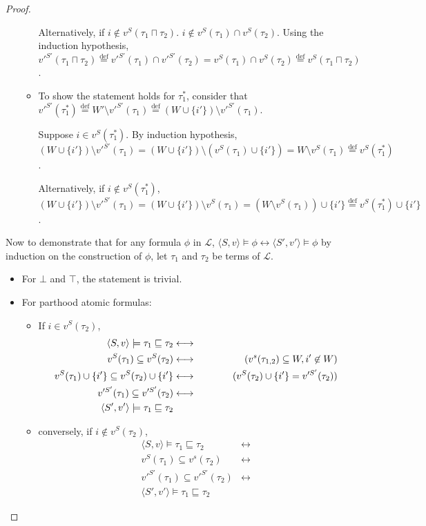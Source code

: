 \documentclass{article}
\newcommand{\lang}{\mathcal{L}}
\newcommand{\lcap}{\sqcap}
\newcommand{\lstar}{^*}
\newcommand{\lpart}{\sqsubseteq}
\newcommand{\eqdef}{\stackrel{\text{def}}{=}}
\begin{document}
\begin{proof}
\begin{itemize}
\begin{itemize}
      Alternatively, if $i \not \in v^S(\tau_1 \lcap \tau_2)$. $i \not \in v^S(\tau_1) \cap v^S(\tau_2)$. Using the induction hypothesis, $v'^{S'}(\tau_1 \lcap \tau_2) \eqdef v'^{S'}(\tau_1) \cap v'^{S'}(\tau_2) = v^S(\tau_1) \cap v^S(\tau_2) \eqdef v^S(\tau_1 \lcap \tau_2)$.

    \item To show the statement holds for $\tau_1\lstar$, consider that $v'^{S'}(\tau_1\lstar) \eqdef W' \setminus v'^{S'}(\tau_1) \eqdef (W \cup \{i'\}) \setminus v'^{S'}(\tau_1)$.

      Suppose $i \in v^S(\tau_1\lstar)$. By induction hypothesis, $(W \cup \{i'\}) \setminus v'^{S'}(\tau_1) = (W \cup \{i'\}) \setminus (v^S(\tau_1) \cup \{i'\}) = W \setminus v^S(\tau_1) \eqdef v^S(\tau_1\lstar)$.

      Alternatively, if $i \not \in v^S(\tau_1\lstar)$, $(W \cup \{i'\}) \setminus v'^{S'}(\tau_1) = (W \cup \{i'\}) \setminus v^S(\tau_1) = (W \setminus v^S(\tau_1)) \cup \{i'\} \eqdef v^S(\tau_1\lstar) \cup \{i'\}$.
    \end{itemize}
\end{itemize}
Now to demonstrate that for any formula $\phi$ in $\lang$, $\langle S, v \rangle \models \phi \longleftrightarrow \langle S', v' \rangle \models \phi$ by induction on the construction of $\phi$, let $\tau_1$ and $\tau_2$ be terms of $\lang$.
\begin{itemize}
  \item For $\bot$ and $\top$, the statement is trivial.
  \item For parthood atomic formulas:
    \begin{itemize}
    \item If $i \in v^S(\tau_2)$,
      \begin{align*}
        \langle S, v \rangle \models \tau_1 \lpart \tau_2 &\longleftrightarrow \\
        v^S(\tau_1) \subseteq v^S(\tau_2) &\longleftrightarrow & \hspace{1.5cm} (v^s(\tau_{1,2}) \subseteq W, i' \not \in W) \\
        v^S(\tau_1) \cup \{i'\} \subseteq v^S(\tau_2) \cup \{i'\} &\longleftrightarrow & (v^S(\tau_2) \cup \{i'\} = v'^{S'}(\tau_2)) \\
        v'^{S'}(\tau_1) \subseteq v'^{S'}(\tau_2) &\longleftrightarrow  \\
        \langle S', v' \rangle \models \tau_1 \lpart \tau_2
      \end{align*}
    \item conversely, if $i \not \in v^S(\tau_2)$,
      \begin{align*}
        \langle S, v \rangle \models \tau_1 \lpart \tau_2 &\longleftrightarrow \\
        v^S(\tau_1) \subseteq v^s(\tau_2) &\longleftrightarrow \\
        v'^{S'}(\tau_1) \subseteq v'^{S'}(\tau_2) &\longleftrightarrow \\
        \langle S', v' \rangle \models \tau_1 \lpart \tau_2
      \end{align*}


\end{itemize}
\end{itemize}
\end{proof}
\end{document}
